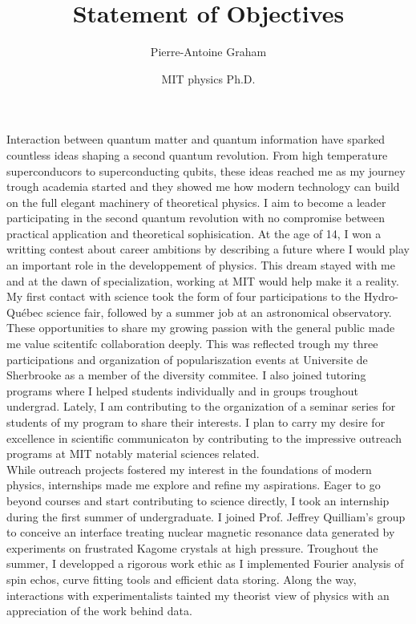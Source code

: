 \documentclass[12pt]{article}
\title{Statement of Objectives}
\author{Pierre-Antoine Graham}
\date{MIT physics Ph.D.}
\begin{document}
\maketitle
\vspace{0.5cm}

Interaction between quantum matter and quantum information have sparked countless ideas shaping a second quantum revolution. From high temperature superconducors to superconducting qubits, these ideas reached me as my journey trough academia started and they showed me how modern technology can build on the full elegant machinery of theoretical physics. I aim to become a leader participating in the second quantum revolution with no compromise between practical application and theoretical sophisication. At the age of 14, I won a writting contest about career ambitions by describing a future where I would play an important role in the developpement of physics. This dream stayed with me and at the dawn of specialization, working at MIT would help make it a reality.\\ 

My first contact with science took the form of four participations to the Hydro-Québec science fair, followed by a summer job at an astronomical observatory. These opportunities to share my growing passion with the general public made me value scitentifc collaboration deeply. This was reflected trough my three participations and organization of populariszation events at Universite de Sherbrooke as a member of the diversity commitee. I also joined tutoring programs where I helped students individually and in groups troughout undergrad. Lately, I am contributing to the organization of a seminar series for students of my program to share their interests. I plan to carry my desire for excellence in scientific communicaton by contributing to the impressive outreach programs at MIT notably material sciences related.\\  

While outreach projects fostered my interest in the foundations of modern physics, internships made me explore and refine my aspirations. Eager to go beyond courses and start contributing to science directly, I took an internship during the first summer of undergraduate. I joined Prof. Jeffrey Quilliam's group to conceive an interface treating nuclear magnetic resonance data generated by experiments on frustrated Kagome crystals at high pressure. Troughout the summer, I developped a rigorous work ethic as I implemented Fourier analysis of spin echos, curve fitting tools and efficient data storing. Along the way, interactions with experimentalists tainted my theorist view of physics with an appreciation of the work behind data.\\
\end{document}
